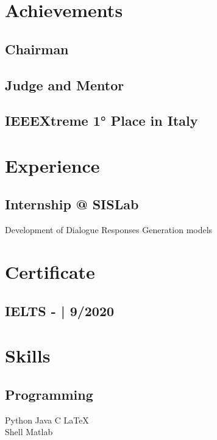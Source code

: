 \documentclass[]{plushcv}
\begin{document}
\hfill
\begin{minipage}[t]{0.25\textwidth} 

\section{Achievements} 
\subsection{Chairman}
\sectionsep

\subsection{Judge and Mentor}
\sectionsep

\subsection{IEEEXtreme 1° Place in Italy }
\sectionsep

\section{Experience} 
\subsection{Internship @ SISLab}
Development of Dialogue Responses Generation models

\section{Certificate} 
\subsection{IELTS - { | 9/2020}}
\sectionsep



\section{Skills}
\subsection{Programming}
\sectionsep
Python \textbullet{} Java \textbullet{} C \textbullet{} \LaTeX \\ Shell \textbullet{} Matlab \\
\sectionsep
\sectionsep


\end{minipage}
\end{document}
